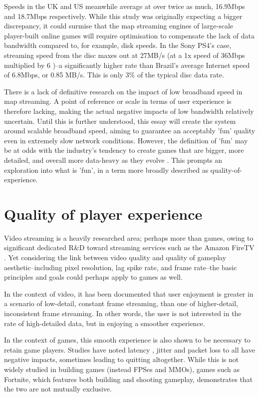 \documentclass{scrartcl}
\begin{document}
Speeds in the UK and US meanwhile average at over twice as much, 16.9Mbps and 18.7Mbps respectively. While this study was originally expecting a bigger discrepancy, it could surmise that the map streaming engines of large-scale player-built online games will require optimisation to compensate the lack of data bandwidth compared to, for example, disk speeds. In the Sony PS4's case, streaming speed from the disc maxes out at 27MB/s (at a 1x speed of 36Mbps \cite{bluray} multiplied by 6 \cite{ps4specs})--a significantly higher rate than Brazil's average Internet speed of 6.8Mbps, or 0.85 MB/s. This is only 3\% of the typical disc data rate.

There is a lack of definitive research on the impact of low broadband speed in map streaming. A point of reference or scale in terms of user experience is therefore lacking, making the actual negative impacts of low bandwidth relatively uncertain. Until this is further understood, this essay will create the system around scalable broadband speed, aiming to guarantee an acceptably 'fun' quality even in extremely slow network conditions. However, the definition of 'fun' may be at odds with the industry's tendency to create games that are bigger, more detailed, and overall more data-heavy as they evolve \cite{graphicsvsexperience}. This prompts an exploration into what is 'fun', in a term more broadly described as quality-of-experience.

\section{Quality of player experience} \label{player}
Video streaming is a heavily researched area; perhaps more than games, owing to significant dedicated R\&D toward streaming services such as the Amazon FireTV \cite{amazonresearch}. Yet considering the link between video quality and quality of gameplay aesthetic--including pixel resolution, lag spike rate, and frame rate--the basic principles and goals could perhaps apply to games as well.

In the context of video, it has been documented \cite{qoelargestudy} that user enjoyment is greater in a scenario of low-detail, constant frame streaming, than one of higher-detail, inconsistent frame streaming. In other words, the user is not interested in the rate of high-detailed data, but in enjoying a smoother experience.

In the context of games, this smooth experience is also shown to be necessary to retain game players. Studies have noted latency \cite{qossensitivity} \cite{lagragequits}, jitter and packet loss \cite{lagragequits} to all have negative impacts, sometimes leading to quitting altogether. While this is not widely studied in building games (instead FPSes and MMOs), games such as \cite{topgames} Fortnite, which features both building and shooting gameplay, demonstrates that the two are not mutually exclusive.
\end{document}

